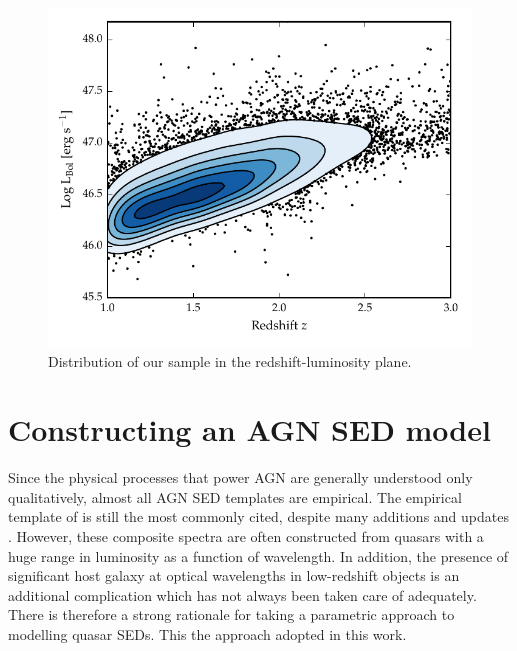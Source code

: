 \begin{figure}
  \centering
  \includegraphics[width=\textwidth]{figures/chapter05/lum_z.pdf}
  \caption[{Distribution of our sample in the redshift-luminosity plane.}]{Distribution of our sample in the redshift-luminosity plane.}
  \label{fig:lum_z}
\end{figure}

\section{Constructing an AGN SED model}

Since the physical processes that power AGN are generally understood only qualitatively, almost all AGN SED templates are empirical. 
The empirical template of \citet{elvis94} is still the most commonly cited, despite many additions and updates \citep[e.g.][]{polletta00, kuraszkiewicz03, risaliti04, richards06,  polletta07, lusso10, shang11, marchese12, trichas12}. 
However, these composite spectra are often constructed from quasars with a huge range in luminosity as a function of wavelength. 
In addition, the presence of significant host galaxy at optical wavelengths in low-redshift objects is an additional complication which has not always been taken care of adequately.
There is therefore a strong rationale for taking a parametric approach to modelling quasar SEDs. 
This the approach adopted in this work. 

